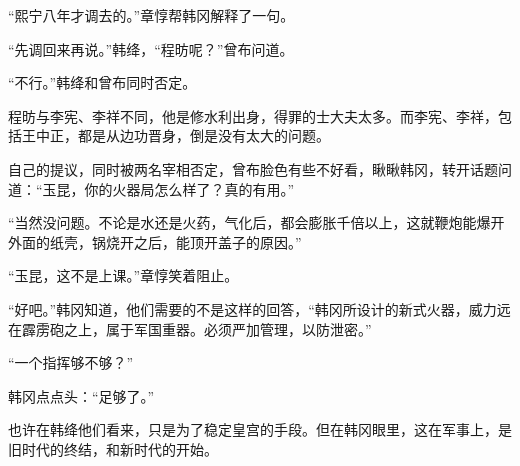 “熙宁八年才调去的。”章惇帮韩冈解释了一句。

“先调回来再说。”韩绛，“程昉呢？”曾布问道。

“不行。”韩绛和曾布同时否定。

程昉与李宪、李祥不同，他是修水利出身，得罪的士大夫太多。而李宪、李祥，包括王中正，都是从边功晋身，倒是没有太大的问题。

自己的提议，同时被两名宰相否定，曾布脸色有些不好看，瞅瞅韩冈，转开话题问道：“玉昆，你的火器局怎么样了？真的有用。”

“当然没问题。不论是水还是火药，气化后，都会膨胀千倍以上，这就鞭炮能爆开外面的纸壳，锅烧开之后，能顶开盖子的原因。”

“玉昆，这不是上课。”章惇笑着阻止。

“好吧。”韩冈知道，他们需要的不是这样的回答，“韩冈所设计的新式火器，威力远在霹雳砲之上，属于军国重器。必须严加管理，以防泄密。”

“一个指挥够不够？”

韩冈点点头：“足够了。”

也许在韩绛他们看来，只是为了稳定皇宫的手段。但在韩冈眼里，这在军事上，是旧时代的终结，和新时代的开始。
